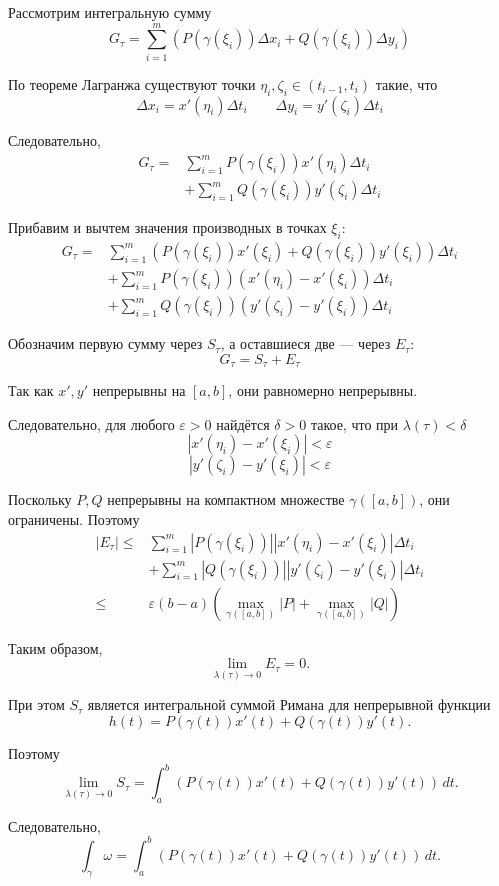 \documentclass[12pt,a4paper]{article}
\begin{document}
\begin{proofbox}{}
Рассмотрим интегральную сумму
\[
G_\tau
=
\sum_{i=1}^{m}
\left(
P(\gamma(\xi_i))\Delta x_i
+
Q(\gamma(\xi_i))\Delta y_i
\right)
\]

По теореме Лагранжа существуют точки
$\eta_i,\zeta_i\in(t_{i-1},t_i)$ такие, что
\[
\Delta x_i=x'(\eta_i)\Delta t_i
\qquad
\Delta y_i=y'(\zeta_i)\Delta t_i
\]

Следовательно,
\[
\begin{aligned}
G_\tau
={}&
\sum_{i=1}^{m}
P(\gamma(\xi_i))x'(\eta_i)\Delta t_i
\\
&+
\sum_{i=1}^{m}
Q(\gamma(\xi_i))y'(\zeta_i)\Delta t_i
\end{aligned}
\]

Прибавим и вычтем значения производных в точках $\xi_i$:
\[
\begin{aligned}
G_\tau
={}&
\sum_{i=1}^{m}
\left(
P(\gamma(\xi_i))x'(\xi_i)
+
Q(\gamma(\xi_i))y'(\xi_i)
\right)\Delta t_i
\\
&+
\sum_{i=1}^{m}
P(\gamma(\xi_i))
\left(x'(\eta_i)-x'(\xi_i)\right)\Delta t_i
\\
&+
\sum_{i=1}^{m}
Q(\gamma(\xi_i))
\left(y'(\zeta_i)-y'(\xi_i)\right)\Delta t_i
\end{aligned}
\]

Обозначим первую сумму через $S_\tau$, а оставшиеся две — через $E_\tau$:
\[
G_\tau=S_\tau+E_\tau
\]

Так как $x',y'$ непрерывны на $[a,b]$, они равномерно непрерывны.

Следовательно, для любого $\varepsilon>0$ найдётся $\delta>0$ такое, что при $\lambda(\tau)<\delta$
\[
|x'(\eta_i)-x'(\xi_i)|<\varepsilon
\]
\[
|y'(\zeta_i)-y'(\xi_i)|<\varepsilon
\]

Поскольку $P,Q$ непрерывны на компактном множестве $\gamma([a,b])$, они ограничены. Поэтому
\[
\begin{aligned}
|E_\tau|
\le{}&
\sum_{i=1}^{m}
|P(\gamma(\xi_i))|
|x'(\eta_i)-x'(\xi_i)|\Delta t_i
\\
&+
\sum_{i=1}^{m}
|Q(\gamma(\xi_i))|
|y'(\zeta_i)-y'(\xi_i)|\Delta t_i
\\
\le{}&
\varepsilon(b-a)
\left(
\max_{\gamma([a,b])}|P|
+
\max_{\gamma([a,b])}|Q|
\right)
\end{aligned}
\]

Таким образом,
\[
\lim_{\lambda(\tau)\to0}E_\tau=0.
\]

При этом $S_\tau$ является интегральной суммой Римана для непрерывной функции
\[
h(t)=P(\gamma(t))x'(t)+Q(\gamma(t))y'(t).
\]

Поэтому
\[
\lim_{\lambda(\tau)\to0}S_\tau
=
\int_a^b
\left(
P(\gamma(t))x'(t)
+
Q(\gamma(t))y'(t)
\right)\,dt.
\]

Следовательно,
\[
\int_\gamma\omega
=
\int_a^b
\left(
P(\gamma(t))x'(t)
+
Q(\gamma(t))y'(t)
\right)\,dt.
\]
\end{proofbox}
\end{document}
